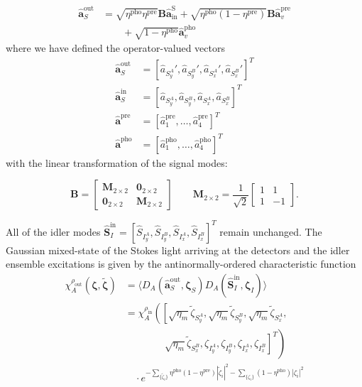\documentclass[aps,twocolumn,secnumarabic,amsmath,amssymb,pra,groupedaddress,
showpacs, showkeys]{revtex4-1}
\newcommand{\pna}[1]{\left(#1\right)}
\newcommand{\pnb}[1]{\left[#1\right]}
\newcommand{\eqn}[1]{
\begin{equation}
	#1
\end{equation}
}
\begin{document}
\begin{align}
\mathbf{\hat{a}}^{\textrm{out}}_S & = 
\sqrt{\eta^{\textrm{pho}}\eta^{\textrm{pre}}} \mathbf{B} \mathbf{\hat{a}}^{\textrm{S}}_{\textrm{in}}
+\sqrt{\eta^{\textrm{pho}}\pna{1-\eta^{\textrm{pre}}}}\mathbf{B} \mathbf{\hat{a}}^{\textrm{pre}}_v
 \nonumber \\ & \qquad +\sqrt{1-\eta^{\textrm{pho}}}\mathbf{\hat{a}}^{\textrm{pho}}_v
\end{align}
where we have defined the operator-valued vectors
\begin{align}
	\mathbf{\hat{a}}^{\textrm{out}}_S&=\pnb{\hat{a}_{S^A_y}',\hat{a}_{S^B_y}',\hat{a}_{S^A_x}',\hat{a}_{S^B_x}'}^{{T}} \nonumber\\
	\mathbf{\hat{a}}_{S}^{\textrm{in}}&=\pnb{\hat{a}_{S^A_y},\hat{a}_{S^B_y},\hat{a}_{S^A_x},\hat{a}_{S^B_x}}^{{T}} \nonumber\\
	\mathbf{\hat{a}}^{\textrm{pre}}&=\pnb{\hat{a}_1^{\textrm{pre}},\ldots, \hat{a}_4^{\textrm{pre}}}^{{T}} \nonumber\\
	\mathbf{\hat{a}}^{\textrm{pho}}&=\pnb{\hat{a}^{\textrm{pho}}_1,\ldots, \hat{a}^{\textrm{pho}}_4}^{{T}}
\end{align}
with the linear transformation of the signal modes:
\eqn{ 
\mathbf{B}=
\left[ 
\begin{array}{cc}
\mathbf{M}_{2\times 2} & \mathbf{0}_{2\times 2} \\
\mathbf{0}_{2\times 2} & \mathbf{M}_{2\times 2}
\end{array} 
\right]
\qquad 
\mathbf{M}_{2\times 2}=
\frac{1}{\sqrt{2}}\left[ 
\begin{array}{cc}
1 & 1 \\
1 & -1\end{array} \right].\label{eqn:chap3:linear_beamsplitter}}
All of the idler modes
$\mathbf{\hat{S}}_{{I}}^{\textrm{in}}=\pnb{\hat{S}_{I^A_y},\hat{S}_{I^B_y},\hat{S}_{I^A_x},\hat{S}_{I^B_x}}^{{T}}$
remain unchanged. The Gaussian mixed-state of the Stokes light arriving at the
detectors and the idler ensemble excitations is given by the
antinormally-ordered characteristic function
\begin{align}
	\chi_A^{\rho_{\textrm{out}}}\pna{\bm{\zeta}, \bm{\tilde{\zeta}}} & =\langle D_A\pna{\mathbf{\hat{a}}_S^{\textrm{out}}, \bm{\zeta}_S} D_A\pna{\mathbf{\hat{S}}_I^{\textrm{in}}, \bm{\zeta}_I} \rangle\nonumber \\
	& =
        \chi_A^{\rho_{\textrm{in}}}\left(
          \left[\sqrt{\eta_{m}}\tilde{\zeta}_{S^A_y},\sqrt{\eta_{m}}\tilde{\zeta}_{S^B_y},\sqrt{\eta_{m}}\tilde{\zeta}_{S^A_x},
            \right.\right.\nonumber \\
    & \left.{}\left.{}\qquad\qquad\sqrt{\eta_{m}}\tilde{\zeta}_{S^B_x}, \zeta_{I^A_y},\zeta_{I^B_y},\zeta_{I^A_x},\zeta_{I^B_x} \right] ^{T}\right) \nonumber \\
    & \quad \cdot e^{-\sum_{\{\tilde{\zeta}_i\}}\eta^{\textrm{pho}}\pna{1- \eta^{\textrm{pre}}}|\tilde{\zeta}_i|^2-\sum_{\{{\zeta}_i\}}\pna{1-\eta^{\textrm{pho}}}|{\zeta}_i|^2} \label{eqn:chap3:chia_orig}
\end{align}
\end{document}
